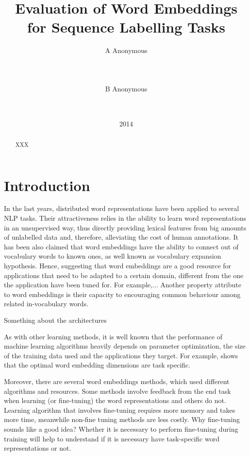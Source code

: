 \documentclass[11pt]{article}
\title{Evaluation of Word Embeddings for Sequence Labelling Tasks}
\author{A Anonymous 
   \\%
   \\ %
   \\ %
  \\ %
\And
  B Anonymous
   \\%
   \\%
   \\ %
}
\date{2014}
\begin{document}
\maketitle
\begin{abstract}
XXX
\end{abstract}

\newcommand{\gabi}[1]{\textcolor{blue}{#1}}
\newcommand{\tim}[1]{\textcolor{red}{#1}}
\newcommand{\lizhen}[1]{\textcolor{green}{#1}}
\newcommand{\nss}[1]{\textcolor{magenta}{#1}}

\section{Introduction}
In the last years, distributed word representations
have been applied to several NLP tasks.
Their attractiveness relies in the ability to learn word representations in an unsupervised way, thus directly providing lexical features from big amounts of unlabelled data 
and, therefore, alleviating the cost of human annotations.
It has been also claimed that word embeddings
have the ability to connect out of vocabulary words to known ones, as well known as vocabulary expansion hypothesis. 
Hence, suggesting that word embeddings are a good resource 
for applications that need to be adapted to a certain domain, 
different from the one the application have been tuned for.
For example,...
Another property attribute to word embeddings is their 
capacity to encouraging common behaviour among related in-vocabulary words.

Something about the architectures

As with other learning methods, it is well known that
the performance of machine learning algorithms heavily depends on
parameter optimization, the size of the training data used and the applications they target.
For example, \cite{turian2010word} shows that the optimal word embedding dimensions are task specific.

Moreover, there are several word embeddings methods, which used different algorithms and resources. 
Some methods involve feedback from the end task when learning (or fine-tuning) the word representations and others do not. 
Learning algorithm that involves fine-tuning requires more
memory and takes more time, meanwhile non-fine tuning methods
are less costly.
Why fine-tuning sounds like a good idea?
Whether it is necessary to perform fine-tuning during training 
will help to understand if it is necessary have task-specific 
word representations or not.
\end{document}
